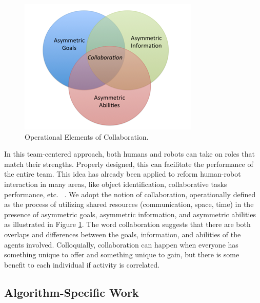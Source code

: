 \documentclass[phd]{byuprop}
\begin{document}
\begin{figure}[hbtp]
\centering
\includegraphics[width=0.4\linewidth]{./fig/collaboration.png}
\caption{Operational Elements of Collaboration.}
\label{fig:collaboration}
\end{figure}

In this team-centered approach, both humans and robots can take on roles that match their strengths. Properly designed, this can facilitate the performance of the entire team.
This idea has already been applied to reform human-robot interaction in many areas, like object identification, collaborative tasks performance, etc. ~\cite{Hoffman2004}. 
We adopt the notion of collaboration, operationally defined as the process of utilizing shared resources (communication, space, time) in the presence of asymmetric goals, asymmetric information, and asymmetric abilities as illustrated in Figure \ref{fig:collaboration}. 
The word collaboration suggests that there are both overlaps and differences between the goals, information, and abilities of the agents involved. Colloquially, collaboration can happen when everyone has something unique to offer and something unique to gain, but there is some benefit to each individual if activity is correlated.


\subsection{Algorithm-Specific Work}
\end{document}

